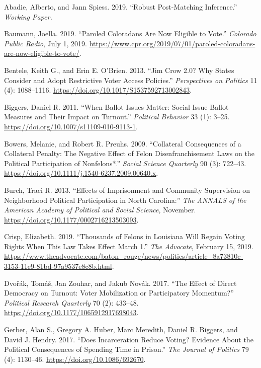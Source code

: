 \documentclass[
  12pt,
]{article}
\newlength{\cslhangindent}
\newenvironment{cslreferences}%
  {\setlength{\parindent}{0pt}%
  \everypar{\setlength{\hangindent}{\cslhangindent}}\ignorespaces}%
  {\par}
\begin{document}
\hypertarget{refs}{}
\begin{cslreferences}
\leavevmode\hypertarget{ref-Abadie2019}{}%
Abadie, Alberto, and Jann Spiess. 2019. ``Robust Post-Matching Inference.'' \emph{Working Paper.}

\leavevmode\hypertarget{ref-Baumann2019}{}%
Baumann, Joella. 2019. ``Paroled Coloradans Are Now Eligible to Vote.'' \emph{Colorado Public Radio}, July 1, 2019. \url{https://www.cpr.org/2019/07/01/paroled-coloradans-are-now-eligible-to-vote/}.

\leavevmode\hypertarget{ref-Bentele2013}{}%
Bentele, Keith G., and Erin E. O'Brien. 2013. ``Jim Crow 2.0? Why States Consider and Adopt Restrictive Voter Access Policies.'' \emph{Perspectives on Politics} 11 (4): 1088--1116. \url{https://doi.org/10.1017/S1537592713002843}.

\leavevmode\hypertarget{ref-Biggers2011}{}%
Biggers, Daniel R. 2011. ``When Ballot Issues Matter: Social Issue Ballot Measures and Their Impact on Turnout.'' \emph{Political Behavior} 33 (1): 3--25. \url{https://doi.org/10.1007/s11109-010-9113-1}.

\leavevmode\hypertarget{ref-Bowers2009}{}%
Bowers, Melanie, and Robert R. Preuhs. 2009. ``Collateral Consequences of a Collateral Penalty: The Negative Effect of Felon Disenfranchisement Laws on the Political Participation of Nonfelons*.'' \emph{Social Science Quarterly} 90 (3): 722--43. \url{https://doi.org/10.1111/j.1540-6237.2009.00640.x}.

\leavevmode\hypertarget{ref-Burch2013}{}%
Burch, Traci R. 2013. ``Effects of Imprisonment and Community Supervision on Neighborhood Political Participation in North Carolina:'' \emph{The ANNALS of the American Academy of Political and Social Science}, November. \url{https://doi.org/10.1177/0002716213503093}.

\leavevmode\hypertarget{ref-Crisp2019}{}%
Crisp, Elizabeth. 2019. ``Thousands of Felons in Louisiana Will Regain Voting Rights When This Law Takes Effect March 1.'' \emph{The Advocate}, February 15, 2019. \url{https://www.theadvocate.com/baton_rouge/news/politics/article_8a73810c-3153-11e9-81bd-97a9537e8c8b.html}.

\leavevmode\hypertarget{ref-Dvorak2017}{}%
Dvořák, Tomáš, Jan Zouhar, and Jakub Novák. 2017. ``The Effect of Direct Democracy on Turnout: Voter Mobilization or Participatory Momentum?'' \emph{Political Research Quarterly} 70 (2): 433--48. \url{https://doi.org/10.1177/1065912917698043}.

\leavevmode\hypertarget{ref-Gerber2017}{}%
Gerber, Alan S., Gregory A. Huber, Marc Meredith, Daniel R. Biggers, and David J. Hendry. 2017. ``Does Incarceration Reduce Voting? Evidence About the Political Consequences of Spending Time in Prison.'' \emph{The Journal of Politics} 79 (4): 1130--46. \url{https://doi.org/10.1086/692670}.


\end{cslreferences}
\end{document}

